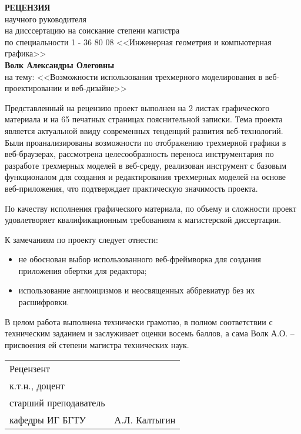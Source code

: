 


  \begin{center}
    \MakeUppercase{\textbf{Рецензия}}\\[1em]

    научного руководителя \\
    на дисссертацию на соискание степени магистра \\
    по специальности 1 - 36 80 08 <<Инженерная геометрия и компьютерная графика>> \\[1em]

    \textbf{Волк Александры Олеговны} \\[1em]

    {на тему: <<Возможности использования трехмерного моделирования в веб-проектировании и веб-дизайне>>}\\[1em]
  \end{center}

  Представленный на рецензию проект выполнен на 2 листах графического материала и на 65 печатных страницах пояснительной записки.
  Тема проекта является актуальной ввиду современных тенденций развития веб-технологий. Были проанализированы возможности по отображению трехмерной графики
  в веб-браузерах, рассмотрена целесообразность переноса инструментария по разработе трехмерных моделей в веб-среду, реализован инструмент с базовым функционалом
  для создания и редактирования трехмерных моделей на основе веб-приложения, что подтверждает практическую значимость проекта.

  По качеству исполнения графического материала, по объему и сложности проект удовлетворяет квалификационным требованиям к магистерской диссертации.

  К замечаниям по проекту следует отнести:
  \begin{itemize}
    \item не обоснован выбор использованного веб-фреймворка для создания приложения обертки для редактора;
    \item использование англоицизмов и неосвященных аббревиатур без их расшифровки.
  \end{itemize}

  В целом работа выполнена технически грамотно, в полном соответствии с техническим заданием и заслуживает оценки восемь баллов, а сама Волк А.О. -- присвоения ей степени магистра технических наук.
  
  \vfill
  \begin{center}
    \begin{tabular}{ p{}p{} }
      Рецензент \\
      к.т.н., доцент \\
      старший преподаватель \\
      кафедры ИГ БГТУ & А.Л. Калтыгин\\[1em]
    \end{tabular}

  \end{center}

